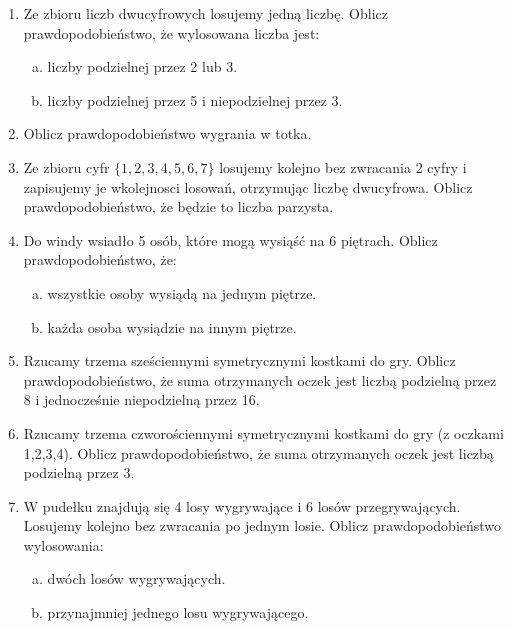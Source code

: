 \documentclass[12pt,a4paper]{article}
\begin{document}
\begin{enumerate}[1.]
\item Ze zbioru liczb dwucyfrowych losujemy jedną liczbę. Oblicz prawdopodobieństwo, że wylosowana liczba jest:
\begin{enumerate}[a)]
	\item liczby podzielnej przez 2 lub 3.
	\item liczby podzielnej przez 5 i niepodzielnej przez 3.
\end{enumerate}
\item Oblicz prawdopodobieństwo wygrania w totka.
\item  Ze zbioru cyfr $\{1,2,3,4,5,6,7\}$ losujemy kolejno bez zwracania 2 cyfry i zapisujemy je wkolejnosci losowań, otrzymując liczbę dwucyfrowa. Oblicz prawdopodobieństwo, że będzie to liczba parzysta.
\item Do windy wsiadło 5 osób, które mogą wysiąść na 6 piętrach. Oblicz prawdopodobieństwo, że:
\begin{enumerate}[a)]
	\item wszystkie osoby wysiądą na jednym piętrze.
	\item każda osoba wysiądzie na innym piętrze.
\end{enumerate}
\item Rzucamy trzema sześciennymi symetrycznymi kostkami do gry. Oblicz prawdopodobieństwo, że suma otrzymanych oczek jest liczbą podzielną przez 8 i jednocześnie niepodzielną przez 16.
\item Rzucamy trzema czworościennymi symetrycznymi kostkami do gry (z oczkami 1,2,3,4). Oblicz prawdopodobieństwo, że suma otrzymanych oczek jest liczbą podzielną przez 3.
\item W pudełku znajdują się 4 losy wygrywające i 6 losów przegrywających. Losujemy kolejno bez zwracania po jednym losie. Oblicz prawdopodobieństwo wylosowania:
\begin{enumerate}[a)]
	\item dwóch losów wygrywających.
	\item przynajmniej jednego losu wygrywającego.
\end{enumerate}


\end{enumerate}
\end{document}

